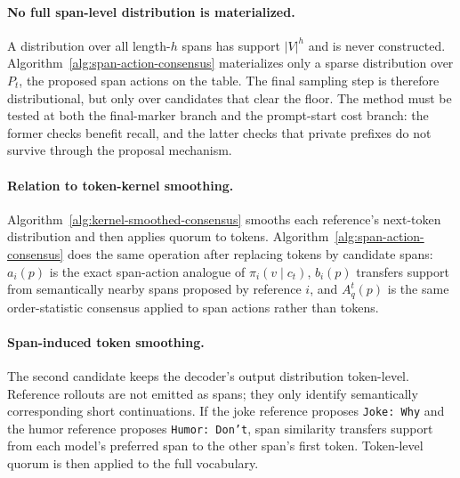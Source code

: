 \documentclass[11pt]{article}
\begin{document}
\paragraph{No full span-level distribution is materialized.} A distribution over all length-$h$ spans has support $|V|^h$ and is never constructed. Algorithm~\ref{alg:span-action-consensus} materializes only a sparse distribution over $P_t$, the proposed span actions on the table. The final sampling step is therefore distributional, but only over candidates that clear the floor. The method must be tested at both the final-marker branch and the prompt-start cost branch: the former checks benefit recall, and the latter checks that private prefixes do not survive through the proposal mechanism.

\paragraph{Relation to token-kernel smoothing.} Algorithm~\ref{alg:kernel-smoothed-consensus} smooths each reference's next-token distribution and then applies quorum to tokens. Algorithm~\ref{alg:span-action-consensus} does the same operation after replacing tokens by candidate spans: $a_i(p)$ is the exact span-action analogue of $\pi_i(v\mid c_t)$, $b_i(p)$ transfers support from semantically nearby spans proposed by reference $i$, and $A_q^t(p)$ is the same order-statistic consensus applied to span actions rather than tokens.

\paragraph{Span-induced token smoothing.} The second candidate keeps the decoder's output distribution token-level. Reference rollouts are not emitted as spans; they only identify semantically corresponding short continuations. If the joke reference proposes \texttt{Joke: Why} and the humor reference proposes \texttt{Humor: Don't}, span similarity transfers support from each model's preferred span to the other span's first token. Token-level quorum is then applied to the full vocabulary.
\end{document}
